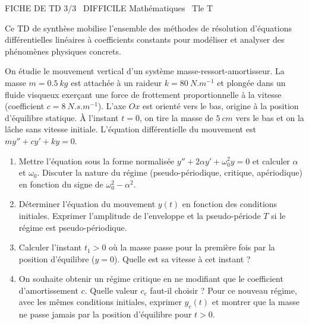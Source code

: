 \documentclass[11pt]{article}
\begin{document}
\begin{tcolorbox}[enhanced,colback=popink,colframe=popink,arc=10pt,boxrule=0pt,left=12pt,right=12pt,top=9pt,bottom=9pt]
{\color{white}\popxbold\small FICHE DE TD 3/3 \textbullet\ DIFFICILE \hfill Mathématiques \textbullet\ Tle T\par}
\end{tcolorbox}
\vspace{4pt}
Ce TD de synthèse mobilise l'ensemble des méthodes de résolution d'équations différentielles linéaires à coefficients constants pour modéliser et analyser des phénomènes physiques concrets.

\begin{exercice}
On étudie le mouvement vertical d'un système masse-ressort-amortisseur. La masse $m = \SI{0,5}{kg}$ est attachée à un raideur $k = \SI{80}{N.m^{-1}}$ et plongée dans un fluide visqueux exerçant une force de frottement proportionnelle à la vitesse (coefficient $c = \SI{8}{N.s.m^{-1}}$). L'axe $Ox$ est orienté vers le bas, origine à la position d'équilibre statique. À l'instant $t=0$, on tire la masse de $\SI{5}{cm}$ vers le bas et on la lâche sans vitesse initiale. L'équation différentielle du mouvement est $m y'' + c y' + k y = 0$.
\begin{enumerate}
    \item Mettre l'équation sous la forme normalisée $y'' + 2\alpha y' + \omega_0^2 y = 0$ et calculer $\alpha$ et $\omega_0$. Discuter la nature du régime (pseudo-périodique, critique, apériodique) en fonction du signe de $\omega_0^2 - \alpha^2$.
    \item Déterminer l'équation du mouvement $y(t)$ en fonction des conditions initiales. Exprimer l'amplitude de l'enveloppe et la pseudo-période $T$ si le régime est pseudo-périodique.
    \item Calculer l'instant $t_1 > 0$ où la masse passe pour la première fois par la position d'équilibre ($y=0$). Quelle est sa vitesse à cet instant ?
    \item On souhaite obtenir un régime critique en ne modifiant que le coefficient d'amortissement $c$. Quelle valeur $c_c$ faut-il choisir ? Pour ce nouveau régime, avec les mêmes conditions initiales, exprimer $y_c(t)$ et montrer que la masse ne passe jamais par la position d'équilibre pour $t>0$.
\end{enumerate}
\end{exercice}
\end{document}
